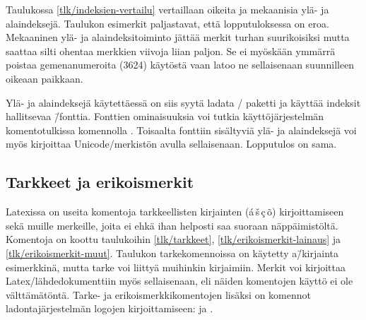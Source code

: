 
Taulukossa \ref{tlk/indeksien-vertailu} vertaillaan oikeita ja
mekaanisia ylä- ja alaindeksejä. Taulukon esimerkit paljastavat, että
lopputuloksessa on eroa. Mekaaninen ylä- ja alaindeksitoiminto jättää
merkit turhan suurikoisiksi mutta saattaa silti ohentaa merkkien viivoja
liian paljon. Se ei myöskään ymmärrä poistaa gemenanumeroita (3624)
käytöstä vaan latoo ne sellaisenaan suunnilleen oikeaan paikkaan.

Ylä- ja alaindeksejä käytettäessä on siis syytä ladata
\-/ paketti ja käyttää indeksit hallitsevaa
 \=/fonttia. Fonttien ominaisuuksia voi tutkia
käyttöjärjestelmän komentotulkissa komennolla . Toisaalta
fonttiin sisältyviä ylä- ja alaindeksejä voi myös kirjoittaa
Unicode\-/merkistön avulla sellaisenaan. Lopputulos on sama.

\subsection{Tarkkeet ja erikoismerkit}
\label{luku/tarkkeet}

Latexissa on useita komentoja tarkkeellisten kirjainten
(\'a\,\v{s}\,\c{c}\,\~o) kirjoittamiseen sekä muille merkeille, joita ei
ehkä ihan helposti saa suoraan näppäimistöltä. Komentoja on koottu
taulukoihin \ref{tlk/tarkkeet}, \ref{tlk/erikoismerkit-lainaus} ja
\ref{tlk/erikoismerkit-muut}. Taulukon tarkekomennoissa on käytetty
a\=/kirjainta esimerkkinä, mutta tarke voi liittyä muihinkin kirjaimiin.
\marginaali{\TeX} \marginaali{\LaTeX} Merkit voi kirjoittaa
Latex\-/lähdedokumenttiin myös sellaisenaan, eli näiden komentojen
käyttö ei ole välttämätöntä. Tarke- ja erikoismerkkikomentojen lisäksi
on komennot ladontajärjestelmän logojen kirjoittamiseen: 
ja .

